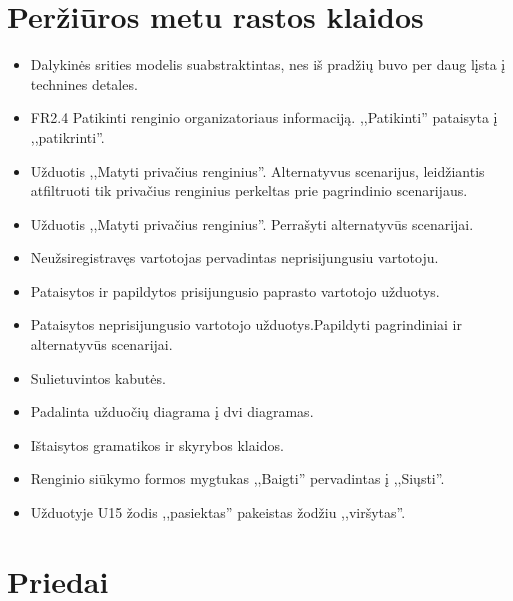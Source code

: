 \documentclass{VUMIFPSkursinis}
\begin{document}
    \section{Peržiūros metu rastos klaidos}
		\begin{itemize}
			\item Dalykinės srities modelis suabstraktintas, nes iš pradžių buvo per daug lįsta į technines detales.
			\item FR2.4 Patikinti renginio organizatoriaus informaciją. ,,Patikinti'' pataisyta į ,,patikrinti''.
			\item Užduotis ,,Matyti privačius renginius''. Alternatyvus scenarijus, leidžiantis atfiltruoti tik privačius renginius perkeltas prie pagrindinio scenarijaus.
			\item Užduotis ,,Matyti privačius renginius''. Perrašyti alternatyvūs scenarijai.
			\item Neužsiregistravęs vartotojas pervadintas neprisijungusiu vartotoju.
			\item Pataisytos ir papildytos prisijungusio paprasto vartotojo užduotys.
			\item Pataisytos neprisijungusio vartotojo užduotys.Papildyti pagrindiniai ir alternatyvūs scenarijai.
			\item Sulietuvintos kabutės.
			\item Padalinta užduočių  diagrama į dvi diagramas.
			\item Ištaisytos gramatikos ir skyrybos klaidos.
			\item Renginio siūkymo formos mygtukas ,,Baigti'' pervadintas į ,,Siųsti''.
			\item Užduotyje U15 žodis ,,pasiektas'' pakeistas žodžiu ,,viršytas''.
		\end{itemize}
		
    \section{Priedai}\label{priedai}
\end{document}
